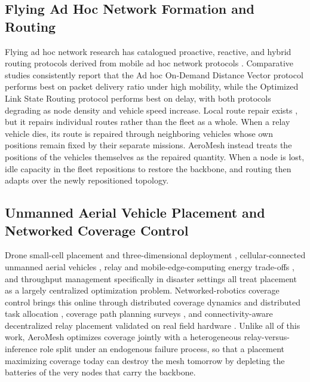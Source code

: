 \documentclass[drones,article,submit,moreauthors]{Definitions/mdpi}
\begin{document}
\subsection{Flying Ad Hoc Network Formation and Routing}

Flying ad hoc network research has catalogued proactive, reactive, and hybrid routing protocols derived from mobile ad hoc network protocols \cite{bekmezci2013flying,lakew2020routing,khan2020routing,arafat2019routing}. Comparative studies consistently report that the Ad hoc On-Demand Distance Vector protocol performs best on packet delivery ratio under high mobility, while the Optimized Link State Routing protocol performs best on delay, with both protocols degrading as node density and vehicle speed increase. Local route repair exists \cite{biomo2014enhanced,perkins2003aodv}, but it repairs individual routes rather than the fleet as a whole. When a relay vehicle dies, its route is repaired through neighboring vehicles whose own positions remain fixed by their separate missions. AeroMesh instead treats the positions of the vehicles themselves as the repaired quantity. When a node is lost, idle capacity in the fleet repositions to restore the backbone, and routing then adapts over the newly repositioned topology.

\subsection{Unmanned Aerial Vehicle Placement and Networked Coverage Control}

Drone small-cell placement and three-dimensional deployment \cite{mozaffari2016efficient,mozaffari2019tutorial,boryaliniz2016new}, cellular-connected unmanned aerial vehicles \cite{zeng2019cellular}, relay and mobile-edge-computing energy trade-offs \cite{zeng2019energy}, and throughput management specifically in disaster settings \cite{chiaraviglio2019optimal} all treat placement as a largely centralized optimization problem. Networked-robotics coverage control brings this online through distributed coverage dynamics and distributed task allocation \cite{skaltsis2023review,chen2024drl,huang2022multicamera}, coverage path planning surveys \cite{cabreira2019survey}, and connectivity-aware decentralized relay placement validated on real field hardware \cite{tardioli2024decentralized}. Unlike all of this work, AeroMesh optimizes coverage jointly with a heterogeneous relay-versus-inference role split under an endogenous failure process, so that a placement maximizing coverage today can destroy the mesh tomorrow by depleting the batteries of the very nodes that carry the backbone.
\end{document}
